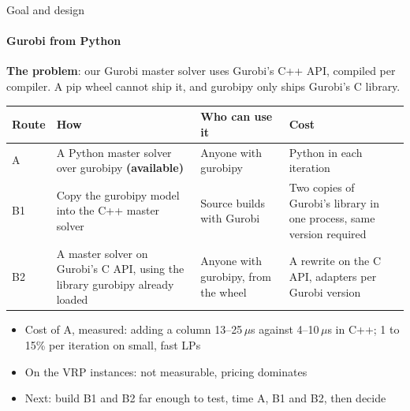 \documentclass[aspectratio=169]{beamer}
\begin{document}
\begin{frame}{Goal and design}
  \framesubtitle{Gurobi from Python}

  \textbf{The problem}: our Gurobi master solver uses Gurobi's C++ API, compiled per compiler.
  A pip wheel cannot ship it, and gurobipy only ships Gurobi's C library.

  \vspace{0.5em}
  \footnotesize
  \begin{tabular}{p{}p{}p{}p{}}
    \toprule
    \textbf{Route} & \textbf{How} & \textbf{Who can use it} & \textbf{Cost} \\
    \midrule
    A & A Python master solver over gurobipy \textbf{(available)}
      & Anyone with gurobipy & Python in each iteration \\
    \addlinespace
    B1 & Copy the gurobipy model into the C++ master solver
      & Source builds with Gurobi & Two copies of Gurobi's library in one process, same version required \\
    \addlinespace
    B2 & A master solver on Gurobi's C API, using the library gurobipy already loaded
      & Anyone with gurobipy, from the wheel & A rewrite on the C API, adapters per Gurobi version \\
    \bottomrule
  \end{tabular}

  \vspace{0.5em}
  \small
  \begin{itemize}
    \item Cost of A, measured: adding a column 13--25\,$\mu$s against 4--10\,$\mu$s in C++;
      1 to 15\% per iteration on small, fast LPs
    \item On the VRP instances: not measurable, pricing dominates
    \item Next: build B1 and B2 far enough to test, time A, B1 and B2, then decide
  \end{itemize}
\end{frame}
\end{document}
